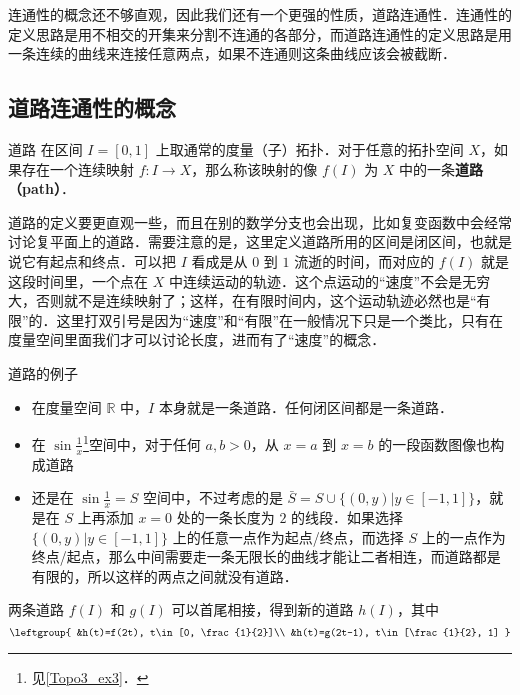 
连通性的概念还不够直观，因此我们还有一个更强的性质，道路连通性．连通性的定义思路是用不相交的开集来分割不连通的各部分，而道路连通性的定义思路是用一条连续的曲线来连接任意两点，如果不连通则这条曲线应该会被截断．

\subsection{道路连通性的概念}
\begin{definition}{道路}\label{Topo4_def1}
在区间 $I=[0,1]$ 上取通常的度量（子）拓扑．对于任意的拓扑空间 $X$，如果存在一个连续映射 $f: I\rightarrow X$，那么称该映射的像 $f(I)$ 为 $X$ 中的一条\textbf{道路（path）}．
\end{definition}

道路的定义要更直观一些，而且在别的数学分支也会出现，比如复变函数中会经常讨论复平面上的道路．需要注意的是，这里定义道路所用的区间是闭区间，也就是说它有起点和终点．可以把 $I$ 看成是从 $0$ 到 $1$ 流逝的时间，而对应的 $f(I)$ 就是这段时间里，一个点在 $X$ 中连续运动的轨迹．这个点运动的“速度”不会是无穷大，否则就不是连续映射了；这样，在有限时间内，这个运动轨迹必然也是“有限”的．这里打双引号是因为“速度”和“有限”在一般情况下只是一个类比，只有在度量空间里面我们才可以讨论长度，进而有了“速度”的概念．

\begin{example}{道路的例子}\label{Topo4_ex1}
\begin{itemize}
\item 在度量空间 $\mathbb{R}$ 中，$I$ 本身就是一条道路．任何闭区间都是一条道路．
\item 在 $\sin{\frac{1}{x}}$\footnote{见\autoref{Topo3_ex3}．}空间中，对于任何 $a, b>0$，从 $x=a$ 到 $x=b$ 的一段函数图像也构成道路
\item 还是在 $\sin{\frac{1}{x}}=S$ 空间中，不过考虑的是 $\bar{S}=S\cup\{(0, y)|y\in [-1,1]\}$，就是在 $S$ 上再添加 $x=0$ 处的一条长度为 $2$ 的线段．如果选择 $\{(0, y)|y\in [-1,1]\}$ 上的任意一点作为起点/终点，而选择 $S$ 上的一点作为终点/起点，那么中间需要走一条无限长的曲线才能让二者相连，而道路都是有限的，所以这样的两点之间就没有道路．

\end{itemize}
\end{example}

两条道路 $f(I)$ 和 $g(I)$ 可以首尾相接，得到新的道路 $h(I)$，其中
\begin{equation}
\leftgroup{
&h(t)=f(2t), t\in[0, \frac{1}{2}]\\
&h(t)=g(2t-1), t\in[\frac{1}{2}, 1]
}
\end{equation}


